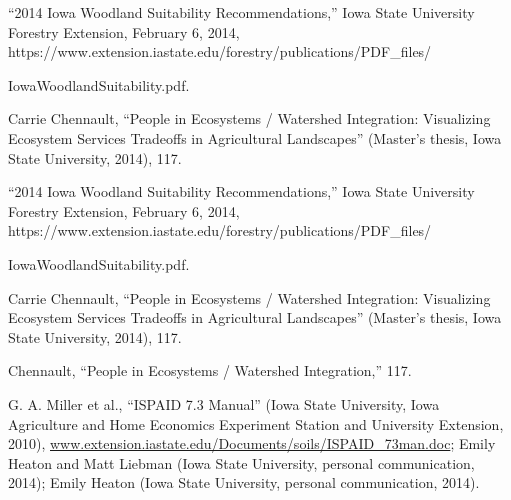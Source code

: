 \documentclass[11pt]{article}
\begin{document}
\begin{thebibliography}{1}
  “2014 Iowa Woodland Suitability Recommendations,” Iowa State University Forestry Extension, February 6, 2014, https://www.extension.iastate.edu/forestry/publications/PDF_files/
  
  IowaWoodlandSuitability.pdf.
  
   Carrie Chennault, “People in Ecosystems / Watershed Integration: Visualizing Ecosystem Services Tradeoffs in Agricultural Landscapes” (Master’s thesis, Iowa State University, 2014), 117.
  
   “2014 Iowa Woodland Suitability Recommendations,” Iowa State University Forestry Extension, February 6, 2014, https://www.extension.iastate.edu/forestry/publications/PDF_files/
  
  IowaWoodlandSuitability.pdf.
  
  Carrie Chennault, “People in Ecosystems / Watershed Integration: Visualizing Ecosystem Services Tradeoffs in Agricultural Landscapes” (Master’s thesis, Iowa State University, 2014), 117.
  
  Chennault, “People in Ecosystems / Watershed Integration,” 117.
  
    G. A. Miller et al., “ISPAID 7.3 Manual” (Iowa State University, Iowa Agriculture and Home Economics Experiment Station and University Extension, 2010), \url{www.extension.iastate.edu/Documents/soils/ISPAID_73man.doc}; Emily Heaton and Matt Liebman (Iowa State University, personal communication, 2014); Emily Heaton (Iowa State University, personal communication, 2014).
   
\end{thebibliography}
\end{document}
